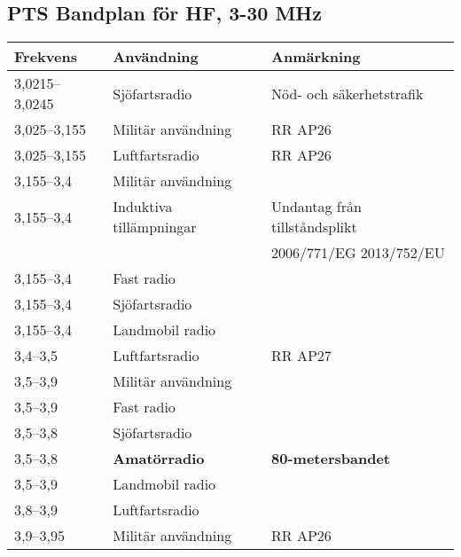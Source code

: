 \begin{landscape}
\clearpage

\small
\subsection{PTS Bandplan för HF, 3-30 MHz}
\begin{longtable}{lll}
\textbf{Frekvens} & \textbf{Användning}              & \textbf{Anmärkning}             \\ \hline \endhead
3,0215--3,0245    & Sjöfartsradio                    & Nöd- och säkerhetstrafik        \\
3,025--3,155      & Militär användning               & RR AP26                         \\
3,025--3,155      & Luftfartsradio                   & RR AP26                         \\
3,155--3,4        & Militär användning               &                                 \\
3,155--3,4        & Induktiva tillämpningar          & Undantag från tillståndsplikt   \\ 
                  &                                  & 2006/771/EG 2013/752/EU         \\
3,155--3,4        & Fast radio                       &                                 \\
3,155--3,4        & Sjöfartsradio                    &                                 \\
3,155--3,4        & Landmobil radio                  &                                 \\
3,4--3,5          & Luftfartsradio                   & RR AP27                         \\
3,5--3,9          & Militär användning               &                                 \\	 
3,5--3,9          & Fast radio                       &                                 \\
3,5--3,8          & Sjöfartsradio                    &                                 \\
3,5--3,8          & \textbf{Amatörradio}             & \textbf{80-metersbandet}        \\
3,5--3,9          & Landmobil radio                  &                                 \\
3,8--3,9          & Luftfartsradio                   &                                 \\
3,9--3,95         & Militär användning               & RR AP26                         \\

\end{longtable}
\end{landscape}

